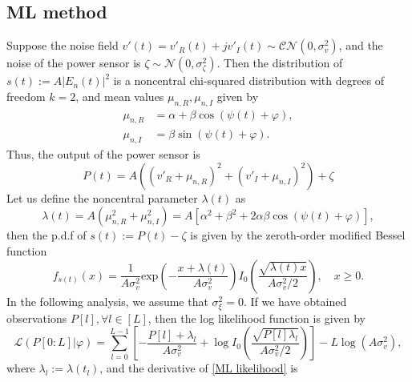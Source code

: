 \documentclass[12pt,draftclsnofoot,journal,onecolumn]{IEEEtran}
\theoremstyle{nonumberplain}
\def \exp {\text{exp}}
\begin{document}
\subsection{ML method}
    Suppose the noise field $v'(t)=v'_R(t) + jv'_I(t)\sim \mathcal{CN}(0, \sigma_v^2)$, and the noise of the power sensor is $\zeta \sim \mathcal{N}(0, \sigma_{\zeta}^2)$. Then the distribution of $s(t) := A\left|E_n(t)\right|^2$ is a noncentral chi-squared distribution with degrees of freedom $k=2$, and mean values $\mu_{n,R}, \mu_{n,I}$ given by
                    \begin{subequations}
\label{chi2 distribution mean values}
\begin{align}
\label{mu_n,R}
\mu_{n,R} & = \alpha + \beta \cos(\psi(t)+\varphi),\\
\label{mu_n,L}
\mu_{n,I} & = \beta \sin(\psi(t)+\varphi).
\end{align}
\end{subequations}
    Thus, the output of the power sensor is 
    \begin{equation}
        P(t)  = A\left((v'_{R} + \mu_{n,R})^2 + (v'_{I} + \mu_{n,I})^2 \right)+ \zeta 
        \label{eqn:sensor power}
    \end{equation}
    Let us define the noncentral parameter $\lambda(t)$ as
    \begin{equation}
        \lambda(t)  = A(\mu_{n,R}^2 + \mu_{n,I}^2) = A\left[\alpha^{2}+\beta^{2}+2\alpha\beta\cos\left(\psi(t)+\varphi\right)\right],
    \end{equation}
    then the p.d.f of $s(t) := P(t)-\zeta$ is given by the zeroth-order modified Bessel function
    \begin{equation}
        f_{s(t)}(x) = \frac{1}{A\sigma_{v}^2} \exp\left(-\frac{x+\lambda(t)}{A\sigma_v^2}\right)I_{0}\left(\frac{\sqrt{\lambda(t) x}}{A\sigma_v^2/2}\right),\quad x \geq 0.
        \label{ML single observation}
    \end{equation}
    In the following analysis, we assume that $\sigma_{\xi}^2 = 0$. If we have obtained observations $P[l], \forall l\in [L]$, then the log likelihood function is given by
    \begin{equation}
        \mathcal{L}(P[0:L] | \varphi) = \sum_{l=0}^{L-1}\left[-\frac{P[l] + \lambda_l}{A\sigma_v^2} + \log I_0\left(\frac{\sqrt{P[l] \lambda_l}}{A\sigma_v^2/2}\right)\right] - L\log(A\sigma_v^2),
        \label{ML likelihood}
    \end{equation}
    where $\lambda_l := \lambda(t_l)$, and the derivative of \eqref{ML likelihood} is 
\end{document}
